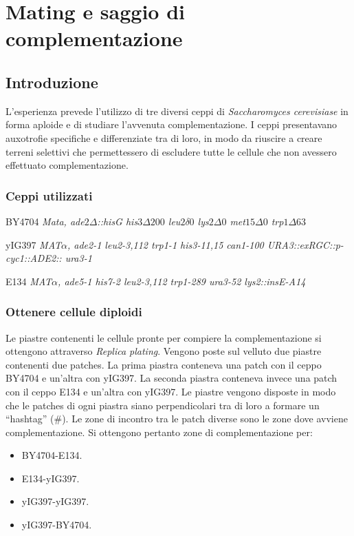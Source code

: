 \section*{Mating e saggio di complementazione}

	\subsection*{Introduzione}
	L'esperienza prevede l'utilizzo di tre diversi ceppi di \emph{Saccharomyces cerevisiase} in forma aploide e di studiare l'avvenuta complementazione.
	I ceppi presentavano auxotrofie specifiche e differenziate tra di loro, in modo da riuscire a creare terreni selettivi che permettessero di escludere tutte le cellule che non avessero effettuato complementazione.
	
		\subsubsection*{Ceppi utilizzati}
		\begin{center}
			BY4704 \emph{Mata, ade$2\Delta$::hisG his$3\Delta200$ leu$2\delta 0$ lys$2\Delta0$ met$15\Delta0$ trp$1\Delta63$}
		\end{center}
		\begin{center}
			yIG397 \emph{MAT$\alpha$, ade2-1 leu2-3,112 trp1-1 his3-11,15 can1-100 URA3::exRGC::p-cyc1::ADE2:: ura3-1}
		\end{center}
		\begin{center}
			E134 \emph{MAT$\alpha$, ade5-1 his7-2 leu2-3,112 trp1-289 ura3-52 lys2::insE-A14}
		\end{center}

		\subsubsection*{Ottenere cellule diploidi}
		Le piastre contenenti le cellule pronte per compiere la complementazione si ottengono attraverso \emph{Replica plating}.
		Vengono poste sul velluto due piastre contenenti due patches.
		La prima piastra conteneva una patch con il ceppo BY4704 e un'altra con yIG397.
		La seconda piastra conteneva invece una patch con il ceppo E134 e un'altra con yIG397.
		Le piastre vengono disposte in modo che le patches di ogni piastra siano perpendicolari tra di loro a formare un ``hashtag'' ($\#$).
		Le zone di incontro tra le patch diverse sono le zone dove avviene complementazione.
		Si ottengono pertanto zone di complementazione per:
		\begin{multicols}{2}
			\begin{itemize}
				\item BY4704-E134.
				\item E134-yIG397.
				\item yIG397-yIG397.
				\item yIG397-BY4704.
			\end{itemize}
		\end{multicols}


